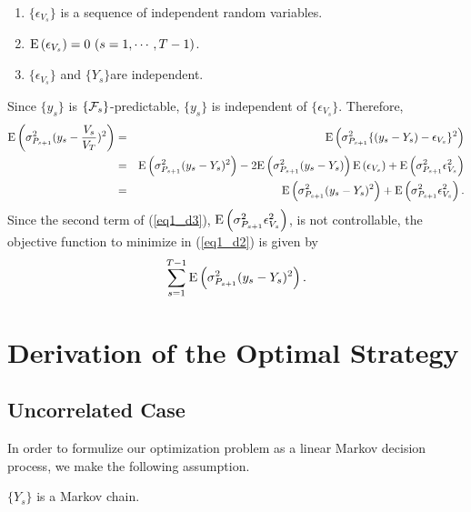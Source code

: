 \begin{assumption}\label{ass_d2}
\quad \\
\vspace*{-7mm}
\begin{enumerate}
\item $\{ \epsilon_{V_s} \}$ is a sequence of independent random variables.
\item ${\mathrm{E}}\left( \epsilon_{V_s} \right) = 0\ (s=1,\cdots,T-1)$.
\item $\{ \epsilon_{V_s} \}$ and $\{ Y_s \}$are independent.
\end{enumerate}
\end{assumption}
Since $\{ y_s \}$ is $\{ {\cal F}_{s} \}$-predictable, $\{ y_s \}$ is
independent of $\{ \epsilon_{V_s} \}$.  Therefore, 
\begin{eqnarray}
  {\mathrm{E}}\left( \sigma_{P_{s+1}}^2 (y_s-\frac{V_s}{V_T})^2 \right)
  & = & {\mathrm{E}}\left( \sigma_{P_{s+1}}^2 \{(y_s-Y_s) - \epsilon_{V_s}\}^2 \right) \nonumber \\
  & = & {\mathrm{E}}\left( \sigma_{P_{s+1}}^2 (y_s-Y_s)^2 \right) - 2 {\mathrm{E}}\left( \sigma_{P_{s+1}}^2 (y_s-
Y_s) \right){\mathrm{E}}\left( \epsilon_{V_s} \right) + {\mathrm{E}}\left( \sigma_{P_{s+1}}^2\epsilon_{V_s}^2 \right) \nonumber \\
  & = & {\mathrm{E}}\left( \sigma_{P_{s+1}}^2 (y_s-Y_s)^2 \right) + 
{\mathrm{E}}\left( \sigma_{P_{s+1}}^2\epsilon_{V_s}^2 \right). \label{eq1_d3}
\end{eqnarray}
Since the second term of (\ref{eq1_d3}), ${\mathrm{E}}\left( \sigma_{P_{s+1}}^2 
\epsilon_{V_s}^2 \right)$, is not controllable, the objective function to minimize in 
(\ref{eq1_d2}) is given by
\[ %
  \sum_{s=1}^{T-1}  \ex{\sigma_{P_{s+1}}^2 (y_s - Y_s)^2}.
\] %




\section{Derivation of the Optimal Strategy}\label{sec_d3}

\subsection{Uncorrelated Case}
In order to formulize our optimization problem as a linear Markov decision 
process, we make the following assumption.

\begin{assumption}\label{ass_d3}
 \quad $\{ Y_s \}$ is a Markov chain.
\end{assumption}

